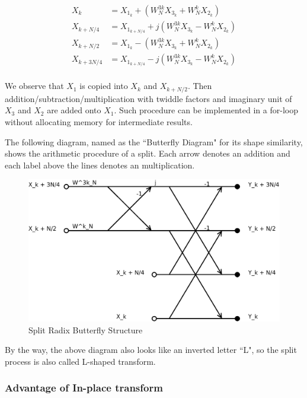 \documentclass[a4paper]{report}
\begin{document}
	\[\begin{split}
  X_k 		  & = X_{1_k} + \left(W_N^{3k} X_{3_k} + W_N^k X_{2_k}\right)\\
  X_{k + N/4}  & = X_{1_{k + N/4}} + j\left(W_N^{3k} X_{3_k} - W_N^k X_{2_k}\right) \\
  X_{k + N/2}  & = X_{1_k} - \left(W_N^{3k} X_{3_k} + W_N^k X_{2_k}\right) \\
  X_{k + 3N/4} & = X_{1_{k + N/4}} - j\left(W_N^{3k} X_{3_k} - W_N^k X_{2_k}\right) \\
	\end{split}\]
	
	We observe that $X_1$ is copied into $X_k$ and $X_{k + N/2}$. Then addition/subtraction/multiplication with twiddle factors and imaginary unit of $X_3$ and $X_2$ are added onto $X_1$. Such procedure can be implemented in a for-loop without allocating memory for intermediate results.
	
	The following diagram, named as the ``Butterfly Diagram" for its shape similarity, shows the arithmetic procedure of a split. Each arrow denotes an addition and each label above the lines denotes an multiplication.
	
	\begin{figure}[htp]
		\centering
		\includegraphics[scale=0.13]{../dia/split-butterfly.png}
		\caption{Split Radix Butterfly Structure}
	\end{figure}

\newpage

	By the way, the above diagram also looks like an inverted letter ``L", so the split process is also called L-shaped transform.

\subsubsection{Advantage of In-place transform} \indent
\end{document}
